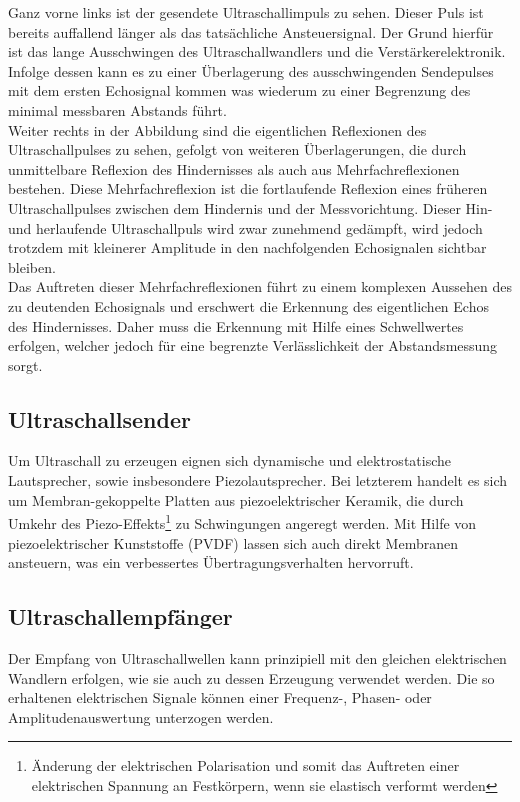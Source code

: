 Ganz vorne links ist der gesendete Ultraschallimpuls zu sehen. Dieser Puls ist bereits auffallend länger als das tatsächliche Ansteuersignal. Der Grund hierfür ist das lange Ausschwingen des Ultraschallwandlers und die Verstärkerelektronik. Infolge dessen kann es zu einer Überlagerung des ausschwingenden Sendepulses mit dem ersten Echosignal kommen was wiederum zu einer Begrenzung des minimal messbaren Abstands führt.\\
Weiter rechts in der Abbildung sind die eigentlichen Reflexionen des Ultraschallpulses zu sehen, gefolgt von weiteren Überlagerungen, die durch unmittelbare Reflexion des Hindernisses als auch aus Mehrfachreflexionen bestehen. Diese Mehrfachreflexion ist die fortlaufende Reflexion eines früheren Ultraschallpulses zwischen dem Hindernis und der Messvorichtung. Dieser Hin- und herlaufende Ultraschallpuls wird zwar zunehmend gedämpft, wird jedoch trotzdem mit kleinerer Amplitude in den nachfolgenden Echosignalen sichtbar bleiben.\\
Das Auftreten dieser Mehrfachreflexionen führt zu einem komplexen Aussehen des zu deutenden Echosignals und erschwert die Erkennung des eigentlichen Echos des Hindernisses. Daher muss die Erkennung mit Hilfe eines Schwellwertes erfolgen, welcher jedoch für eine begrenzte Verlässlichkeit der Abstandsmessung sorgt.

\subsection{Ultraschallsender}
Um Ultraschall zu erzeugen eignen sich dynamische und elektrostatische Lautsprecher, sowie insbesondere Piezolautsprecher.  Bei letzterem handelt es sich um Membran-gekoppelte Platten aus piezoelektrischer Keramik, die durch Umkehr des Piezo-Effekts\footnote{Änderung der elektrischen Polarisation und somit das Auftreten einer elektrischen Spannung an Festkörpern, wenn sie elastisch verformt werden} zu Schwingungen angeregt werden. Mit Hilfe von piezoelektrischer Kunststoffe (PVDF) lassen sich auch direkt Membranen ansteuern, was ein verbessertes Übertragungsverhalten hervorruft.

\subsection{Ultraschallempfänger}
Der Empfang von Ultraschallwellen kann prinzipiell mit den gleichen elektrischen Wandlern erfolgen, wie sie auch zu dessen Erzeugung verwendet werden. Die so erhaltenen elektrischen Signale können einer Frequenz-, Phasen- oder Amplitudenauswertung unterzogen werden.

